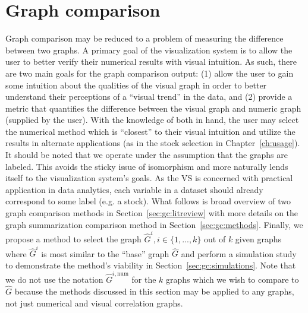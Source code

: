 \chapter{Graph comparison \label{ch:gc}}

Graph comparison may be reduced to a problem of measuring the difference 
between two graphs. 
A primary goal of the visualization system is to allow the user to better 
verify their numerical results with visual intuition. As such, there are two 
main goals for the graph comparison output: (1) allow the user to gain some 
intuition about the qualities of the visual graph in order to better understand 
their perceptions of a ``visual trend'' in the data, and (2) provide a metric 
that quantifies the difference between the visual graph and numeric graph 
(supplied by the user). With the knowledge of both in hand, the user may 
select the numerical method which is 
``closest'' to their visual intuition and utilize the results in alternate 
applications (as in the stock selection in Chapter~\ref{ch:usage}). 
It should be noted that we operate under 
the assumption that the graphs are labeled. This avoids the sticky issue of 
isomorphism and more naturally lends itself to the visualization system's 
goals. As the VS is concerned with practical application in data 
analytics, each variable in a dataset should already correspond to some label 
(e.g. a stock).
What follows is broad overview of two graph comparison methods in 
Section~\ref{sec:gc:litreview} with more details on the graph summarization 
comparison method in Section~\ref{sec:gc:methods}. Finally, we propose a method 
to select the graph $\hat{G}^{i}, i \in \{1,...,k\}$ out of $k$ 
given graphs where $\hat{G}^{i}$ is most similar to the ``base'' 
graph $\hat{G}$ and perform a simulation study to demonstrate the method's 
viability in Section~\ref{sec:gc:simulations}. Note that we do not use the 
notation $\hat{G}^{i,\text{num}}$ for the $k$ graphs which we wish to compare 
to $\hat{G}$ because the methods discussed in this section may be 
applied to any graphs, not just numerical and visual correlation graphs.



